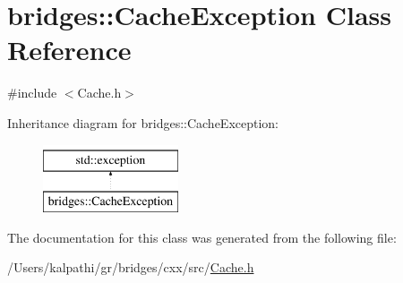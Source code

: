 \hypertarget{classbridges_1_1_cache_exception}{}\section{bridges\+::Cache\+Exception Class Reference}
\label{classbridges_1_1_cache_exception}


{\ttfamily \#include $<$Cache.\+h$>$}

Inheritance diagram for bridges\+::Cache\+Exception\+:\begin{figure}[H]
\begin{center}
\leavevmode
\includegraphics[height=2.000000cm]{classbridges_1_1_cache_exception}
\end{center}
\end{figure}


The documentation for this class was generated from the following file\+:\begin{DoxyCompactItemize}
\item 
/\+Users/kalpathi/gr/bridges/cxx/src/\mbox{\hyperlink{_cache_8h}{Cache.\+h}}\end{DoxyCompactItemize}
